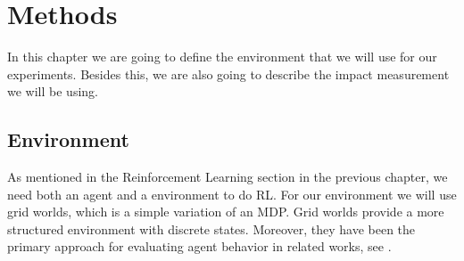 \documentclass[12pt,A4]{report}
\theoremstyle{definition}
\begin{document}







\chapter{Methods}
In this chapter we are going to define the environment that we will use for our experiments. Besides this, we are also going to describe the impact measurement we will be using.

\section{Environment}
As mentioned in the Reinforcement Learning section in the previous chapter, we need both an agent and a environment to do RL. For our environment we will use grid worlds, which is a simple variation of an MDP. Grid worlds provide a more structured environment with discrete states. Moreover, they have been the primary approach for evaluating agent behavior in related works, see \citet{Turner20}.
\end{document}

